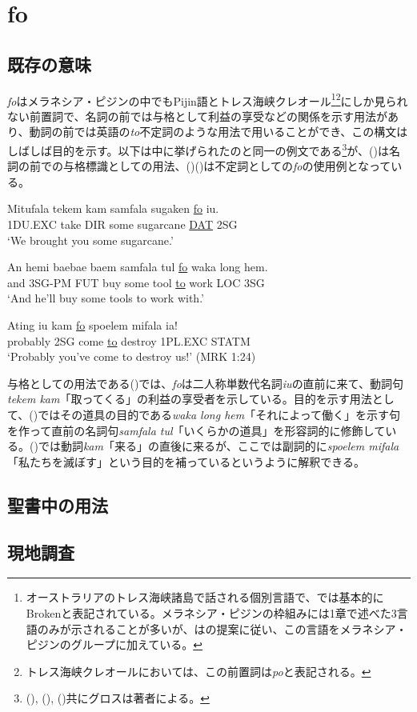 \chapter{fo}
\section{既存の意味}
\textit{fo}はメラネシア・ピジンの中でもPijin語とトレス海峡クレオール\footnote{\label{fn:broken}
オーストラリアのトレス海峡諸島で話される個別言語で、\cite{prepositions}では基本的にBrokenと表記されている。メラネシア・ピジンの枠組みには1章で述べた3言語のみが示されることが多いが、\cite{prepositions}は\cite{keesing}の提案に従い、この言語をメラネシア・ピジンのグループに加えている。}\footnote{トレス海峡クレオールにおいては、この前置詞は\textit{po}と表記される\citep{prepositions}。}にしか見られない前置詞で、名詞の前では与格として利益の享受などの関係を示す用法があり、動詞の前では英語の\textit{to}不定詞のような用法で用いることができ、この構文はしばしば目的を示す\citep{prepositions}。以下は\cite{prepositions}中に挙げられたのと同一の例文である\footnote{(), (), ()共にグロスは著者による。}が、()は名詞の前での与格標識としての用法、()()は不定詞としての\textit{fo}の使用例となっている。

\begin{exe}
\ex
\gll Mitufala tekem kam samfala sugaken \underline{fo} iu.\\
1DU.EXC take DIR some sugarcane \underline{DAT} 2SG\\
\glt `We brought you some sugarcane.' \cite[44]{rr2}

\ex
\gll An hemi baebae baem samfala tul \underline{fo} waka long hem.\\
and 3SG-PM FUT buy some tool \underline{to} work LOC 3SG\\
\glt `And he'll buy some tools to work with.' \cite[270]{todd}

\ex
\gll Ating iu kam \underline{fo} spoelem mifala ia!\\
probably 2SG come \underline{to} destroy 1PL.EXC STATM\\
\glt `Probably you've come to destroy us!' (MRK 1:24)
\end{exe}

与格としての用法である()では、\textit{fo}は二人称単数代名詞\textit{iu}の直前に来て、動詞句\textit{tekem kam}「取ってくる」の利益の享受者を示している。目的を示す用法として、()ではその道具の目的である\textit{waka long hem}「それによって働く」を示す句を作って直前の名詞句\textit{samfala tul}「いくらかの道具」を形容詞的に修飾している。()では動詞\textit{kam}「来る」の直後に来るが、ここでは副詞的に\textit{spoelem mifala}「私たちを滅ぼす」という目的を補っているというように解釈できる。

\section{聖書中の用法}
\section{現地調査}
